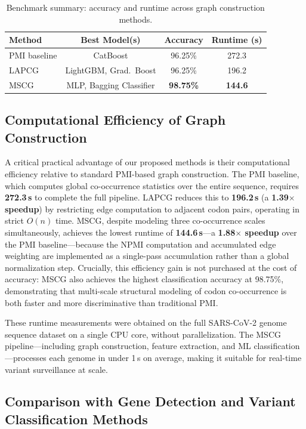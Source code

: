 \documentclass[conference]{IEEEtran}
\begin{document}
\begin{table}[t]
\centering
\caption{Benchmark summary: accuracy and runtime across graph construction methods.}
\label{tab:benchmark_summary}
\begin{tabular}{lccc}
\toprule
\textbf{Method} & \textbf{Best Model(s)} & \textbf{Accuracy} & \textbf{Runtime (s)} \\
\midrule
PMI baseline & CatBoost & 96.25\% & 272.3 \\
LAPCG & LightGBM, Grad.\ Boost & 96.25\% & 196.2 \\
MSCG & MLP, Bagging Classifier & \textbf{98.75\%} & \textbf{144.6} \\
\bottomrule
\end{tabular}
\end{table}

\subsection{Computational Efficiency of Graph Construction}

A critical practical advantage of our proposed methods is their computational efficiency relative to standard PMI-based graph construction. The PMI baseline, which computes global co-occurrence statistics over the entire sequence, requires \textbf{272.3\,s} to complete the full pipeline. LAPCG reduces this to \textbf{196.2\,s} (a \textbf{1.39$\times$ speedup}) by restricting edge computation to adjacent codon pairs, operating in strict $O(n)$ time. MSCG, despite modeling three co-occurrence scales simultaneously, achieves the lowest runtime of \textbf{144.6\,s}---a \textbf{1.88$\times$ speedup} over the PMI baseline---because the NPMI computation and accumulated edge weighting are implemented as a single-pass accumulation rather than a global normalization step. Crucially, this efficiency gain is not purchased at the cost of accuracy: MSCG also achieves the highest classification accuracy at 98.75\%, demonstrating that multi-scale structural modeling of codon co-occurrence is both faster and more discriminative than traditional PMI.

These runtime measurements were obtained on the full SARS-CoV-2 genome sequence dataset on a single CPU core, without parallelization. The MSCG pipeline---including graph construction, feature extraction, and ML classification---processes each genome in under 1\,s on average, making it suitable for real-time variant surveillance at scale.

\subsection{Comparison with Gene Detection and Variant Classification Methods}
\end{document}

